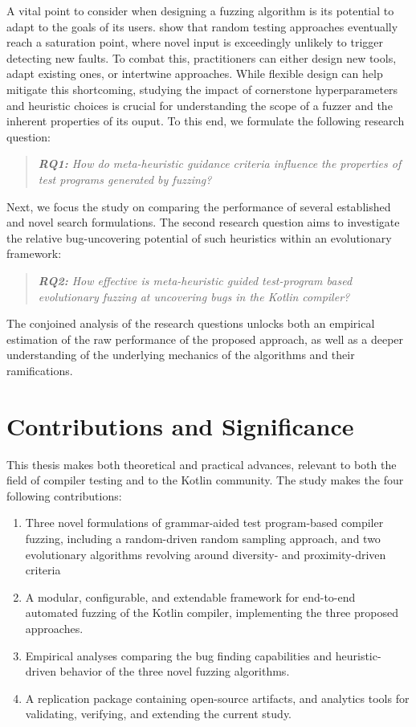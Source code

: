 A vital point to consider when designing a fuzzing algorithm is
its potential to adapt to the goals of its users. \citet{amalfitano2015exploiting}
show that random testing approaches eventually reach a
saturation point, where novel input is exceedingly unlikely to trigger
detecting new faults. 
To combat this, practitioners can either design new tools, adapt existing
ones, or intertwine approaches.
While flexible design can help mitigate this shortcoming, studying the 
impact of cornerstone hyperparameters and heuristic choices
is crucial for understanding the scope of a fuzzer and the
inherent properties of its ouput.
To this end, we formulate the following research question:

\begin{quote}
\centering 
\emph{\textbf{RQ1:} How do meta-heuristic guidance
criteria influence the properties of test programs
generated by fuzzing?}
\end{quote}

Next, we focus the study on comparing the performance of
several established and novel search formulations.
The second research question aims to investigate
the relative bug-uncovering potential of such heuristics
within an evolutionary framework:

\begin{quote}
\centering 
\emph{\textbf{RQ2:} How effective is meta-heuristic
guided test-program based evolutionary fuzzing
at uncovering bugs in the Kotlin compiler?}
\end{quote}

The conjoined analysis of the research questions unlocks both
an empirical estimation of the raw performance of the proposed
approach, as well as a deeper understanding of the underlying
mechanics of the algorithms and their ramifications.

\section{Contributions and Significance}

This thesis makes both theoretical and practical advances,
relevant to both the field of compiler testing and to the 
Kotlin community.
The study makes the four following contributions:

\begin{enumerate}
	\item Three novel formulations of grammar-aided test program-based compiler fuzzing,
including a random-driven random sampling approach,
and two evolutionary algorithms revolving
around diversity- and proximity-driven criteria
	\item A modular, configurable, and extendable framework for
end-to-end automated fuzzing of the Kotlin compiler,
implementing the three proposed approaches.
	\item Empirical analyses comparing the bug finding capabilities
and heuristic-driven behavior of the three novel fuzzing algorithms.
	\item A replication package containing open-source artifacts, and analytics tools
for validating, verifying, and extending the current study.
\end{enumerate}


